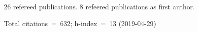 26 refereed publications. 8 refeered publications as first author.

Total citations~=~632; h-index~=~13 (2019-04-29)